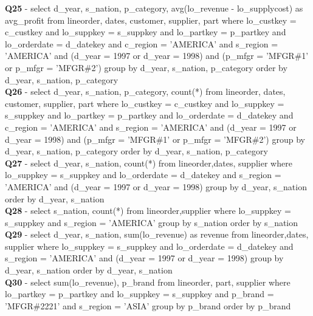 \textbf{Q25} - select d\_year, s\_nation, p\_category, avg(lo\_revenue - lo\_supplycost) as avg\_profit from lineorder, dates, customer, supplier, part   where lo\_custkey = c\_custkey and lo\_suppkey = s\_suppkey and lo\_partkey = p\_partkey and lo\_orderdate = d\_datekey and c\_region = 'AMERICA' and s\_region = 'AMERICA' and (d\_year = 1997 or d\_year = 1998) and (p\_mfgr = 'MFGR\#1' or p\_mfgr = 'MFGR\#2') group by d\_year, s\_nation, p\_category order by d\_year, s\_nation, p\_category \\

\textbf{Q26} - select d\_year, s\_nation, p\_category, count(*) from lineorder, dates, customer, supplier, part  where lo\_custkey = c\_custkey and lo\_suppkey = s\_suppkey and lo\_partkey = p\_partkey and lo\_orderdate = d\_datekey and c\_region = 'AMERICA' and s\_region = 'AMERICA' and (d\_year = 1997 or d\_year = 1998) and (p\_mfgr = 'MFGR\#1' or p\_mfgr = 'MFGR\#2') group by d\_year, s\_nation, p\_category order by d\_year, s\_nation, p\_category \\

\textbf{Q27} - select d\_year, s\_nation, count(*) from  lineorder,dates, supplier  where lo\_suppkey = s\_suppkey and lo\_orderdate = d\_datekey and s\_region = 'AMERICA' and (d\_year = 1997 or d\_year = 1998) group by d\_year, s\_nation order by d\_year, s\_nation \\

\textbf{Q28} - select s\_nation, count(*) from lineorder,supplier   where lo\_suppkey = s\_suppkey and s\_region = 'AMERICA' group by s\_nation order by s\_nation \\

\textbf{Q29} - select d\_year, s\_nation, sum(lo\_revenue) as revenue from lineorder,dates, supplier   where lo\_suppkey = s\_suppkey and lo\_orderdate = d\_datekey and s\_region = 'AMERICA' and (d\_year = 1997 or d\_year = 1998) group by d\_year, s\_nation order by d\_year, s\_nation \\

\textbf{Q30} - select sum(lo\_revenue), p\_brand from lineorder, part, supplier where lo\_partkey = p\_partkey and lo\_suppkey = s\_suppkey and p\_brand = 'MFGR\#2221' and s\_region = 'ASIA' group by p\_brand order by p\_brand
